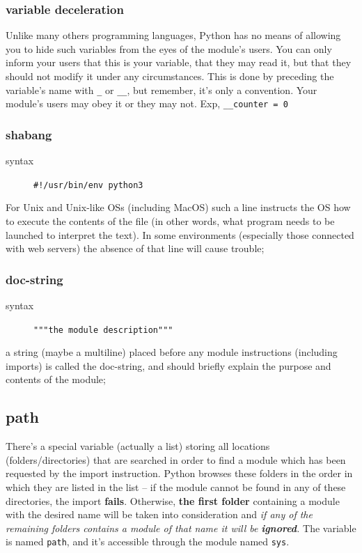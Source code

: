\documentclass[11pt]{article}
\begin{document}
\subsubsection{variable deceleration}
\label{sec:orgc9e6a96}
Unlike many others programming languages, Python has no means of
allowing you to hide such variables from the eyes of the module’s
users. You can only inform your users that this is your variable, that
they may read it, but that they should not modify it under any
circumstances. This is done by preceding the variable’s name with \texttt{\_}
or \texttt{\_\_}, but remember, it’s only a convention. Your module’s users may
obey it or they may not. Exp, \texttt{\_\_counter = 0}

\subsubsection{shabang}
\label{sec:org4e8465b}
\begin{description}
\item[{syntax}] \texttt{\#!/usr/bin/env python3}
\end{description}
For Unix and Unix-like OSs (including MacOS) such a line instructs the
OS how to execute the contents of the file (in other words, what
program needs to be launched to interpret the text). In some
environments (especially those connected with web servers) the absence
of that line will cause trouble;

\subsubsection{doc-string}
\label{sec:orgfc1b781}
\begin{description}
\item[{syntax}] \texttt{"""the module description"""}
\end{description}
a string (maybe a multiline) placed before any module instructions
(including imports) is called the doc-string, and should briefly
explain the purpose and contents of the module;

\subsection{path}
\label{sec:orga757fb3}
There’s a special variable (actually a list) storing all locations
(folders/directories) that are searched in order to find a module
which has been requested by the import instruction. Python browses
these folders in the order in which they are listed in the list – if
the module cannot be found in any of these directories, the import
\textbf{fails}. Otherwise, \textbf{the first folder} containing a module with the
desired name will be taken into consideration and \emph{if any of the}
\emph{remaining folders contains a module of that name it will be}
\emph{\textbf{ignored}.} The variable is named \texttt{path}, and it’s accessible through
the module named \texttt{sys}.
\end{document}
